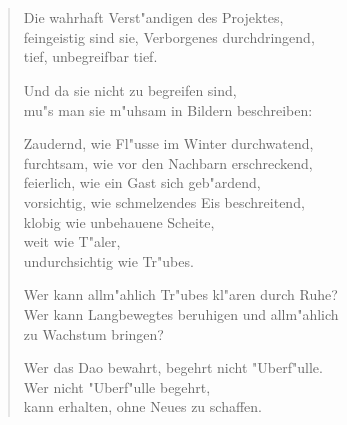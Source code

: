 \documentclass[a4paper,10pt,openany]{book}
\begin{document}
\chapter{}
\begin{verse}
    Die wahrhaft Verst"andigen des Projektes,\\
    feingeistig sind sie, Verborgenes durchdringend,\\
    tief, unbegreifbar tief.

    Und da sie nicht zu begreifen sind,\\
    mu"s man sie m"uhsam in Bildern beschreiben:

    Zaudernd, wie Fl"usse im Winter durchwatend,\\
    furchtsam, wie vor den Nachbarn erschreckend,\\
    feierlich, wie ein Gast sich geb"ardend,\\
    vorsichtig, wie schmelzendes Eis beschreitend,\\
    klobig wie unbehauene Scheite,\\
    weit wie T"aler,\\
    undurchsichtig wie Tr"ubes.

    Wer kann allm"ahlich Tr"ubes kl"aren durch Ruhe?\\
    Wer kann Langbewegtes beruhigen und allm"ahlich\\
    zu Wachstum bringen?

    Wer das Dao bewahrt, begehrt nicht "Uberf"ulle.\\
    Wer nicht "Uberf"ulle begehrt,\\
    kann erhalten, ohne Neues zu schaffen.
\end{verse}
\end{document}
